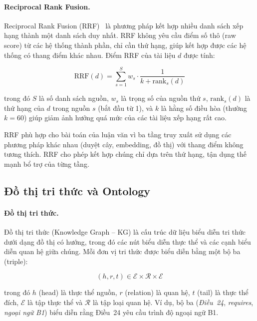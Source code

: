 \paragraph{Reciprocal Rank Fusion.}
\label{sec:cslt-rrf}
Reciprocal Rank Fusion (RRF)~\cite{cormack2009rrf} là phương pháp kết hợp nhiều
danh sách xếp hạng thành một danh sách duy nhất. RRF không yêu cầu điểm số thô
(raw score) từ các hệ thống thành phần, chỉ cần thứ hạng, giúp kết hợp được các
hệ thống có thang điểm khác nhau. Điểm RRF của tài liệu $d$ được tính:

\begin{equation}
  \text{RRF}(d) = \sum_{s=1}^{S} w_s \cdot \frac{1}{k + \text{rank}_s(d)}
  \label{eq:rrf-def}
\end{equation}

\noindent trong đó $S$ là số danh sách nguồn, $w_s$ là trọng số của nguồn thứ $s$,
$\text{rank}_s(d)$ là thứ hạng của $d$ trong nguồn $s$ (bắt đầu từ 1), và $k$ là
hằng số điều hòa (thường $k = 60$) giúp giảm ảnh hưởng quá mức của các tài liệu
xếp hạng rất cao.

RRF phù hợp cho bài toán của luận văn vì ba tầng truy xuất sử dụng các phương pháp
khác nhau (duyệt cây, embedding, đồ thị) với thang điểm không tương thích. RRF cho
phép kết hợp chúng chỉ dựa trên thứ hạng, tận dụng thế mạnh bổ trợ của từng tầng.

\subsection{Đồ thị tri thức và Ontology}
\label{subsec:kg-ontology}

\paragraph{Đồ thị tri thức.}
\label{subsec:do-thi-tri-thuc}
Đồ thị tri thức (Knowledge Graph -- KG) là cấu trúc dữ liệu biểu diễn tri thức
dưới dạng đồ thị có hướng, trong đó các nút biểu diễn thực thể và các cạnh biểu
diễn quan hệ giữa chúng. Mỗi đơn vị tri thức được biểu diễn bằng một bộ ba (triple):

\begin{equation}
  (h, r, t) \in \mathcal{E} \times \mathcal{R} \times \mathcal{E}
  \label{eq:kg-triple}
\end{equation}

\noindent trong đó $h$ (head) là thực thể nguồn, $r$ (relation) là quan hệ, $t$
(tail) là thực thể đích, $\mathcal{E}$ là tập thực thể và $\mathcal{R}$ là tập
loại quan hệ. Ví dụ, bộ ba (\textit{Điều~24}, \textit{requires}, \textit{ngoại ngữ B1})
biểu diễn rằng Điều~24 yêu cầu trình độ ngoại ngữ B1.

